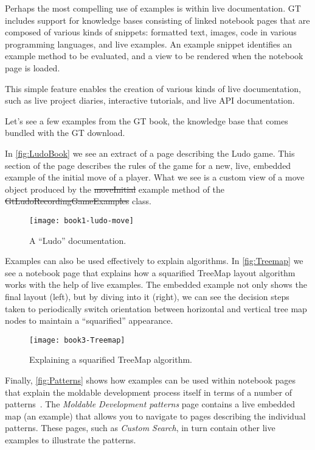 \documentclass[acmsmall,screen,authorversion,nonacm]{acmart} %
\newcommand\ac[1]{\nbc{AC}{#1}{teal}}
\begin{document}


Perhaps the most compelling use of examples is within live documentation.
GT includes support for knowledge bases consisting of linked notebook pages that are composed of various kinds of snippets: formatted text, images, code in various programming languages, and live examples.
An example snippet identifies an example method to be evaluated, and a view to be rendered when the notebook page is loaded.

This simple feature enables the creation of various kinds of live documentation, such as live project diaries, interactive tutorials, and live API documentation.

Let's see a few examples from the GT book, the knowledge base that comes bundled with the GT download.

In \autoref{fig:LudoBook} we see an extract of a page describing the Ludo game.
This section of the page describes the rules of the game for a new, live, embedded example of the initial move of a player.
What we see is a custom view of a move object produced by the \st{moveInitial} example method of the \st{GtLudoRecordingGameExamples} class.

\begin{figure}[h]
  \texttt{[image: book1-ludo-move]}
  \caption{A ``Ludo'' documentation.}
  \label{fig:LudoBook}
\end{figure}

Examples can also be used effectively to explain algorithms.
In \autoref{fig:Treemap} we see a notebook page that explains how a squarified TreeMap layout algorithm works with the help of live examples.
The embedded example not only shows the final layout (left), but by diving into it (right), we can see the decision steps taken to periodically switch orientation between horizontal and vertical tree map nodes to maintain a ``squarified'' appearance.

\begin{figure}[h]
  \texttt{[image: book3-Treemap]}
  \caption{Explaining a squarified TreeMap algorithm.}
  \label{fig:Treemap}
\end{figure}

Finally, \autoref{fig:Patterns} shows how examples can be used within notebook pages that explain the moldable development process itself in terms of a number of patterns~\cite{Nier24a}.
The \emph{Moldable Development patterns} page contains a live embedded map (an example) that allows you to navigate to pages describing the individual patterns.
These pages, such as \emph{Custom Search}, in turn contain other live examples to illustrate the patterns.
\end{document}
